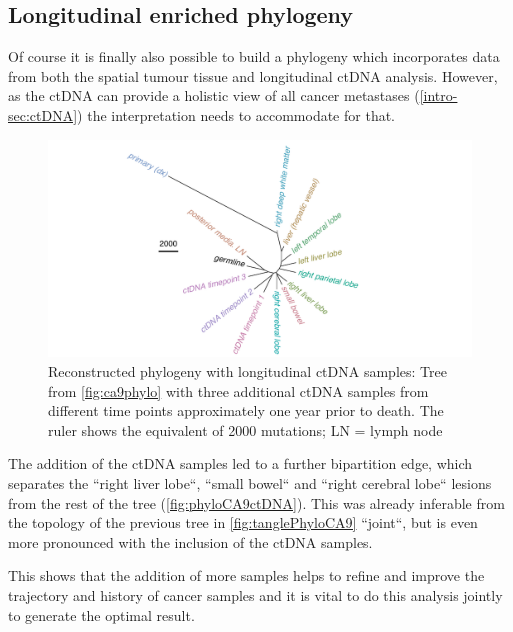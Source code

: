 \subsection{Longitudinal enriched phylogeny}
\label{variantcalling-sec:fullphylo}
Of course it is finally also possible to build a phylogeny which incorporates data from both the spatial tumour tissue and longitudinal ctDNA analysis. However, as the ctDNA can provide a holistic view of all cancer metastases (\autoref{intro-sec:ctDNA}) the interpretation needs to accommodate for that. 

\begin{figure}[ht]
\centering
\includegraphics[width=.99\linewidth]{Figures/jointVariantCalling/phyloCA9_withctDNA.pdf}
\caption[Reconstructed phylogeny with longitudinal ctDNA samples]{Reconstructed phylogeny with longitudinal ctDNA samples: Tree from \autoref{fig:ca9phylo} with three additional ctDNA samples from different time points approximately one year prior to death. The ruler shows the equivalent of 2000 mutations; LN = lymph node} \label{fig:phyloCA9ctDNA}
\end{figure}

The addition of the ctDNA samples led to a further bipartition edge, which separates the ``right liver lobe``, ``small bowel`` and ``right cerebral lobe`` lesions from the rest of the tree (\autoref{fig:phyloCA9ctDNA}). This was already inferable from the topology of the previous tree in \autoref{fig:tanglePhyloCA9} ``joint``, but is even more pronounced with the inclusion of the ctDNA samples.

This shows that the addition of more samples helps to refine and improve the trajectory and history of cancer samples and it is vital to do this analysis jointly to generate the optimal result.